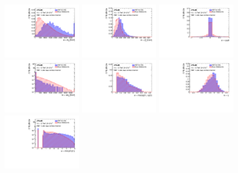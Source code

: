 \label{sec:app-vbf-inputs}
\begin{figure}[htbp]
  \centering
 \includegraphics[width=0.3\textwidth]{figures/VBF/BDT_input_mJJ2cen.pdf}
 \includegraphics[width=0.3\textwidth]{figures/VBF/BDT_input_pTJJ2cen.pdf}
 \includegraphics[width=0.3\textwidth]{figures/VBF/BDT_input_cosTheta_boost2cen.pdf}\\
 \includegraphics[width=0.3\textwidth]{figures/VBF/BDT_input_deltaMJJ2cen.pdf}
 \includegraphics[width=0.3\textwidth]{figures/VBF/BDT_input_max_J1J22cen.pdf}
 \includegraphics[width=0.3\textwidth]{figures/VBF/BDT_input_eta_J_star2cen.pdf}\\
 \includegraphics[width=0.3\textwidth]{figures/VBF/BDT_input_mindRJ1_Ex2cen.pdf}

\end{figure}
